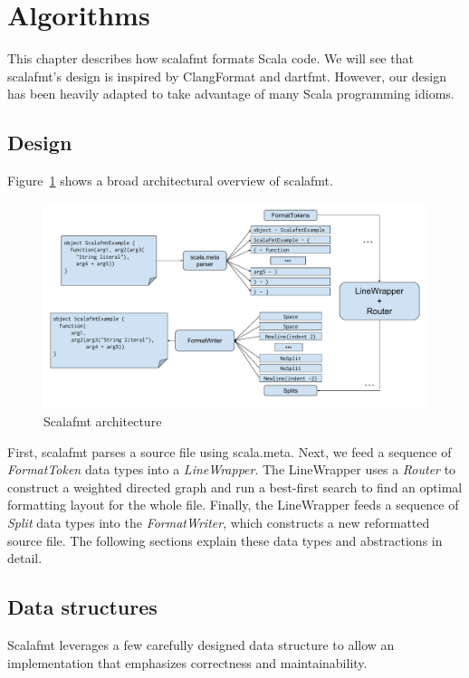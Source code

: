 \section{Algorithms}\label{sec:algorithms}
This chapter describes how scalafmt formats Scala code.
We will see that scalafmt's design is inspired by ClangFormat and dartfmt.
However, our design has been heavily adapted to take advantage of many Scala programming idioms.

\subsection{Design}
Figure~\ref{fig:architecture} shows a broad architectural overview of scalafmt.
\begin{figure}
  \centering
  \includegraphics[width=\textwidth]{img/architechture.pdf}
  \caption{Scalafmt architecture}
  \label{fig:architecture}
\end{figure}
First, scalafmt parses a source file using scala.meta.
Next, we feed a sequence of \emph{FormatToken} data types into a \emph{LineWrapper}.
The LineWrapper uses a \emph{Router} to construct a weighted directed graph and run a best-first search to find an optimal formatting layout for the whole file.
Finally, the LineWrapper feeds a sequence of \emph{Split} data types into the \emph{FormatWriter}, which constructs a new reformatted source file.
The following sections explain these data types and abstractions in detail.

\subsection{Data structures}
Scalafmt leverages a few carefully designed data structure to allow an implementation that emphasizes correctness and maintainability.


